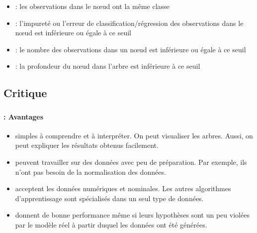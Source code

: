 \documentclass[xcolor=table]{beamer}
\begin{document}
\begin{frame}
	\frametitle{\insertsection}
	\framesubtitle{\insertsubsection}
	
	\begin{itemize}
		\item {} : les observations dans le nœud ont la même classe
		\item {} : l'impureté ou l'erreur de classification/régression des observations dans le nœud est inférieure ou égale à ce seuil
		\item {} : le nombre des observations dans un nœud est inférieure ou égale à ce seuil
		\item {} : la profondeur du nœud dans l'arbre est inférieure à ce seuil
	\end{itemize}
	
\end{frame}

\subsection{Critique}

\begin{frame}
	\frametitle{\insertsection}
	\framesubtitle{\insertsubsection: Avantages}
	
	\begin{itemize}
		\item simples à comprendre et à interpréter. On peut visualiser les arbres. Aussi, on peut expliquer les résultats obtenus facilement.
		\item peuvent travailler sur des données avec peu de préparation. Par exemple, ils n'ont pas besoin de la normalisation des données.
		\item acceptent les données numériques et nominales. Les autres algorithmes d'apprentissage sont spécialisés dans un seul type de données.
		\item donnent de bonne performance même si leurs hypothèses sont un peu violées par le modèle réel à partir duquel les données ont été générées.
	\end{itemize}
	
\end{frame}
\end{document}
